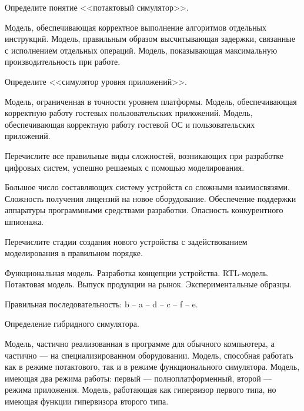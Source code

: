 \begin{questions}

\question[3] Определите понятие <<потактовый симулятор>>.
\begin{choices}
\choice Модель, обеспечивающая корректное выполнение алгоритмов отдельных инструкций.
\correctchoice Модель, правильным образом высчитывающая задержки, связанные с исполнением отдельных операций.
\choice Модель, показывающая максимальную производительность при работе.
\end{choices}

\question[3] Определите <<симулятор уровня приложений>>.
\begin{choices}
\choice Модель, ограниченная в точности уровнем платформы.
\correctchoice Модель, обеспечивающая корректную работу гостевых пользовательских приложений.
\choice Модель, обеспечивающая корректную работу гостевой ОС и пользовательских приложений.
\end{choices}

\question[3] Перечислите все правильные виды сложностей, возникающих при разработке цифровых систем, успешно решаемых с помощью моделирования.
\begin{choices}
\correctchoice Большое число составляющих систему устройств со сложными взаимосвязями.
\choice Сложность получения лицензий на новое оборудование.
\correctchoice Обеспечение поддержки аппаратуры программными средствами разработки.
\choice Опасность конкурентного шпионажа.
\end{choices}

\question[3] Перечислите стадии создания нового устройства с задействованием моделирования в правильном порядке.
\begin{choices}
\choice Функциональная модель.
\choice Разработка концепции устройства.
\choice RTL-модель.
\choice Потактовая модель.
\choice Выпуск продукции на рынок.
\choice Экспериментальные образцы.
\end{choices}
\begin{solution}
    Правильная последовательность: b -- a -- d -- c -- f -- e.
\end{solution}

\question[3] Определение гибридного симулятора.
\begin{choices}
\correctchoice Модель, частично реализованная в программе для обычного компьютера, а частично — на специализированном оборудовании.
\choice Модель, способная работать как в режиме потактового, так и в режиме функционального симулятора.
\choice Модель, имеющая два режима работы: первый — полноплатформенный, второй — режима приложения.
\choice Модель, работающая как гипервизор первого типа, но имеющая функции гипервизора второго типа.
\end{choices}


\end{questions}
